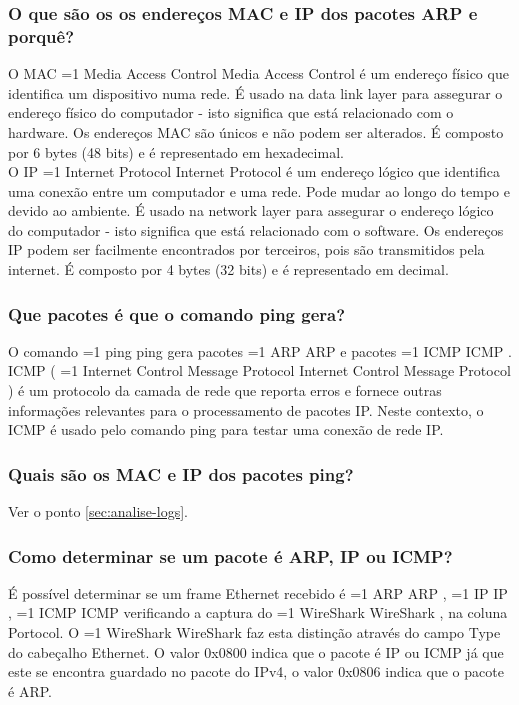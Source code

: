 \documentclass[11pt,a4paper,twocolumn]{article}
\newcommand{\hl}[2][1]{%
  \ifnum#1=1\relax
    \textcolor{text-hl1}{#2}%
  \else
    \textcolor{text-hl2}{#2}%
  \fi
}
\begin{document}
\subsubsection{O que são os os endereços MAC e IP dos pacotes ARP e porquê?}

O MAC \hl{Media Access Control} é um endereço físico que identifica um dispositivo numa rede. É usado na data link layer para assegurar o endereço físico do computador - isto significa que está relacionado com o hardware. Os endereços MAC são únicos e não podem ser alterados. É composto por 6 bytes (48 bits) e é representado em hexadecimal.\\
O IP \hl{Internet Protocol} é um endereço lógico que identifica uma conexão entre um computador e uma rede. Pode mudar ao longo do tempo e devido ao ambiente. É usado na network layer para assegurar o endereço lógico do computador - isto significa que está relacionado com o software. Os endereços IP podem ser facilmente encontrados por terceiros, pois são transmitidos pela internet. É composto por 4 bytes (32 bits) e é representado em decimal.


\subsubsection{Que pacotes é que o comando ping gera?}

O comando \hl{ping} gera pacotes \hl{ARP} e pacotes \hl{ICMP}. ICMP (\hl{Internet Control Message Protocol}) é um protocolo da camada de rede que reporta erros e fornece outras informações relevantes para o processamento de pacotes IP. Neste contexto, o ICMP é usado pelo comando ping para testar uma conexão de rede IP.

\subsubsection{Quais são os MAC e IP dos pacotes ping?}

Ver o ponto \ref{sec:analise-logs}.

\subsubsection{Como determinar se um pacote é ARP, IP ou ICMP?}

É possível determinar se um frame Ethernet recebido é \hl{ARP}, \hl{IP}, \hl{ICMP} verificando a captura do \hl[2]{WireShark}, na coluna Portocol. O \hl[2]{WireShark} faz esta distinção através do campo Type do cabeçalho Ethernet. O valor 0x0800 indica que o pacote é IP ou ICMP já que este se encontra guardado no pacote do IPv4, o valor 0x0806 indica que o pacote é ARP. 
\end{document}
